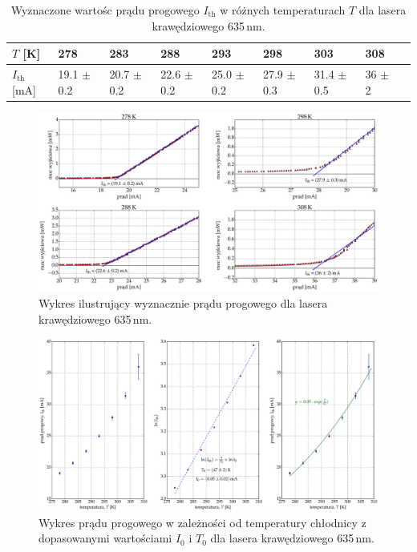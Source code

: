 \begin{table}[H]
\begin{center}
\caption{ Wyznaczone wartośc prądu progowego $I_{\mathrm{th}}$ w różnych temperaturach $T$ dla lasera krawędziowego 635\,nm. }
\begin{tabular}{ | C{1.5cm}|  C{1.5cm} | C{1.5cm} | C{1.5cm}| C{1.5cm} | C{1.5cm}| C{1.5cm}| C{2.0cm}| C{2.0cm}|}
\hline
$T$ [K] 	&   278 & 283  	& 288 & 293 & 298 & 303 & 308 \\ \hline
$I_{\mathrm{th}}$ [mA]  &	19.1 $\pm$ 0.2  & 20.7 $\pm$ 0.2 & 22.6 $\pm$ 0.2 &
25.0 $\pm$ 0.2  & 27.9 $\pm$ 0.3 & 31.4 $\pm$ 0.5 & 36 $\pm$ 2	\\ \hline
\end{tabular}
\end{center}
\label{tab:tabela_635}
\end{table}
\begin{figure}[H]
\center
  \includegraphics[scale=0.30]{plot635/plot_i_th_4.eps}
  \caption{Wykres ilustrujący wyznacznie prądu progowego dla lasera krawędziowego 635\,nm.}
  \label{fig:plot_i_th_4}
\end{figure}
\begin{figure}
\center
  \includegraphics[scale=0.30]{plot635/plot_fit.eps}
  \caption{Wykres prądu progowego w zależności od temperatury chłodnicy z dopasowanymi wartościami $I_{0}$ i $T_{0}$ dla lasera krawędziowego 635\,nm.}
  \label{fig:plot_fit}
\end{figure}
